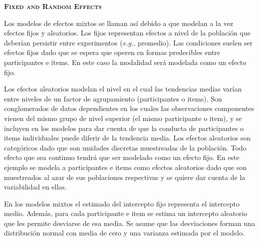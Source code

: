 \documentclass[a4paper,12pt]{article}
\begin{document}
{\scshape\bfseries Fixed and Random Effects}

Los modelos de efectos mixtos se llaman así debido a que modelan a la vez efectos fijos y aleatorios. Los fijos representan efectos a nivel de la población que deberían persistir entre experimentos ({\itshape e.g.,} promedio). Las condiciones suelen ser efectos fijos dado que se espera que operen en formas predecibles entre participantes e items. En este caso la modalidad será modelada como un efecto fijo.

Los efectos aleatorios modelan el nivel en el cual las tendencias medias varían entre niveles de un factor de agrupamiento (participantes o items). Son conglomerados de datos dependientes en los cuales las observaciones componentes vienen del mismo grupo de nivel superior (el mismo participante o item), y se incluyen en los modelos para dar cuenta de que la conducta de participantes o items individuales puede diferir de la tendencia media. Los efectos aleatorios son categóricos dado que son unidades discretas muestreadas de la población. Todo efecto que sea continuo tendrá que ser modelado como un efecto fijo. En este ejemplo se modela a participantes e items como efectos aleatorios dado que son muestreados al azar de sus poblaciones respectivas y se quiere dar cuenta de la variabilidad en ellas.

En los modelos mixtos el estimado del intercepto fijo representa el intercepto medio. Además, para cada participante e item se estima un intercepto aleatorio que les permite desviarse de esa media. Se asume que las desviaciones forman una distribución normal con media de cero y una varianza estimada por el modelo.
\end{document}
